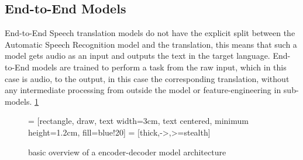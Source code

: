 \subsection{End-to-End Models}
End-to-End Speech translation models do not have the explicit split between the Automatic Speech Recognition model and the translation, this means that such a model gets audio as an input and outputs the text in the target language. 
End-to-End models are trained to perform a task from the raw input, which in this case is audio, to the output, in this case the corresponding translation, without any intermediate processing from outside the model or feature-engineering in sub-models. \ref{fig:end-to-end models}
\begin{figure}
    \centering
     = [rectangle, draw, text width=3cm, text centered, minimum height=1.2cm, fill=blue!20]
 = [thick,->,>=stealth]

\caption{basic overview of a encoder-decoder model architecture}
\label{fig:end-to-end models}
\end{figure}
